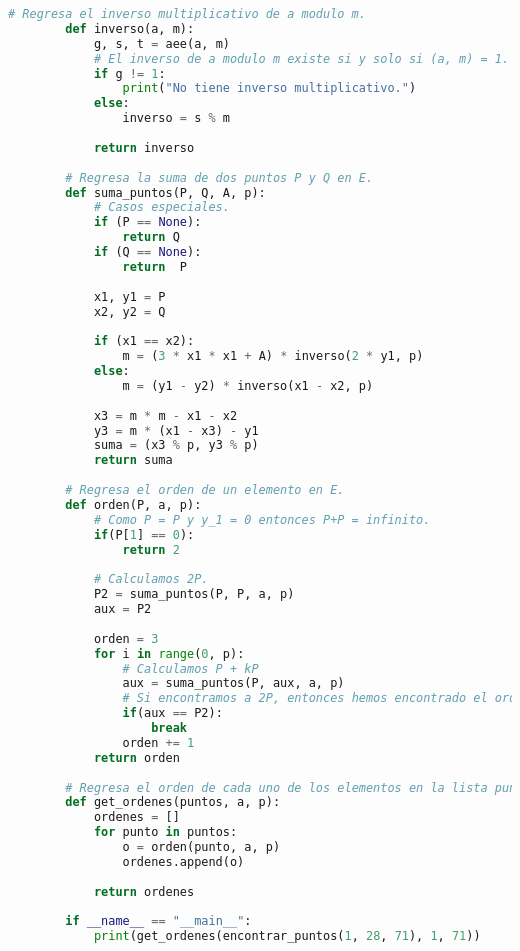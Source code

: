 \documentclass[letterpaper,11pt]{article}
\begin{document}
\begin{enumerate}
\begin{enumerate}
\begin{lstlisting}[language=Python]
        # Regresa el inverso multiplicativo de a modulo m.
        def inverso(a, m):
            g, s, t = aee(a, m)
            # El inverso de a modulo m existe si y solo si (a, m) = 1.
            if g != 1:
                print("No tiene inverso multiplicativo.")
            else:
                inverso = s % m
            
            return inverso
            
        # Regresa la suma de dos puntos P y Q en E. 
        def suma_puntos(P, Q, A, p):
            # Casos especiales.
            if (P == None):
                return Q
            if (Q == None):
                return  P
                
            x1, y1 = P
            x2, y2 = Q
            
            if (x1 == x2):
                m = (3 * x1 * x1 + A) * inverso(2 * y1, p)
            else:
                m = (y1 - y2) * inverso(x1 - x2, p)
                
            x3 = m * m - x1 - x2
            y3 = m * (x1 - x3) - y1
            suma = (x3 % p, y3 % p)
            return suma
        
        # Regresa el orden de un elemento en E.
        def orden(P, a, p):
            # Como P = P y y_1 = 0 entonces P+P = infinito.
            if(P[1] == 0):
                return 2
            
            # Calculamos 2P.
            P2 = suma_puntos(P, P, a, p)
            aux = P2
            
            orden = 3
            for i in range(0, p):
                # Calculamos P + kP
                aux = suma_puntos(P, aux, a, p)
                # Si encontramos a 2P, entonces hemos encontrado el orden.
                if(aux == P2):
                    break
                orden += 1
            return orden
        
        # Regresa el orden de cada uno de los elementos en la lista puntos.
        def get_ordenes(puntos, a, p):
            ordenes = []
            for punto in puntos:
                o = orden(punto, a, p)
                ordenes.append(o)
            
            return ordenes
            
        if __name__ == "__main__":
            print(get_ordenes(encontrar_puntos(1, 28, 71), 1, 71))
        \end{lstlisting}
        

\end{enumerate}
\end{enumerate}
\end{document}
